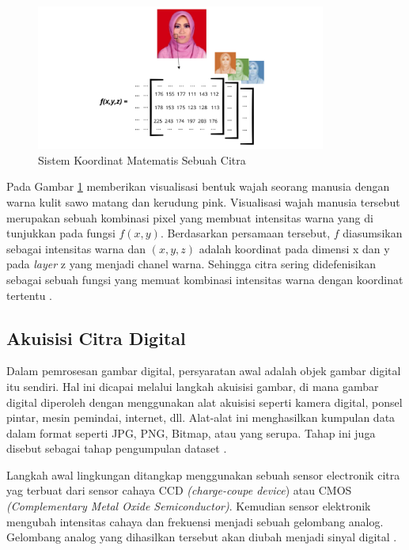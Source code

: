     \begin{figure}[H]
      \centering
      \includegraphics[width=0.85\textwidth]{figures/bab2/citra_digital.png}
      \caption{Sistem Koordinat Matematis Sebuah Citra \cite{Kirana2021}}
      \label{Sistem Koordinat Matematis Sebuah Citra}
    \end{figure}




    
    
    Pada Gambar \ref{Sistem Koordinat Matematis Sebuah Citra} memberikan visualisasi bentuk wajah seorang manusia 
    dengan warna kulit sawo matang dan kerudung pink. Visualisasi wajah manusia tersebut merupakan sebuah kombinasi
     pixel yang membuat intensitas warna yang di tunjukkan pada fungsi $f(x,y)$. Berdasarkan persamaan tersebut, $f$ 
     diasumsikan sebagai intensitas warna dan $(x,y,z)$ adalah koordinat pada dimensi x dan y pada \textit{layer} z yang menjadi chanel warna. 
     Sehingga citra sering didefenisikan sebagai sebuah fungsi yang memuat kombinasi intensitas warna dengan koordinat
      tertentu \cite{Kirana2021}.

\subsection{Akuisisi Citra  Digital}

    Dalam pemrosesan gambar digital, persyaratan awal adalah objek gambar digital itu sendiri. Hal ini dicapai melalui langkah akuisisi gambar, di mana gambar digital diperoleh dengan menggunakan alat akuisisi seperti kamera digital, ponsel pintar, mesin pemindai, internet, dll. Alat-alat ini menghasilkan kumpulan data dalam format seperti JPG, PNG, Bitmap, atau yang serupa. Tahap ini juga disebut sebagai tahap pengumpulan dataset \cite{Dewi2018}.
    
    
    Langkah awal lingkungan ditangkap menggunakan sebuah sensor electronik citra yag terbuat dari sensor cahaya CCD \textit{(charge-coupe device}) atau CMOS \textit{(Complementary Metal Oxide Semiconductor)}. Kemudian sensor elektronik mengubah intensitas cahaya dan frekuensi menjadi sebuah gelombang analog. Gelombang analog yang dihasilkan tersebut akan diubah menjadi sinyal digital \cite{putra2010pengolahan}.

